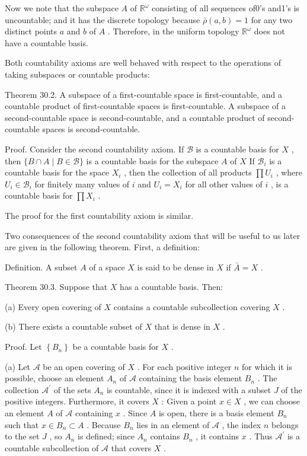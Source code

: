 Now we note that the subspace \(A\) of \({\mathbb{R}}^{\omega }\) consisting of all sequences of0’s and1’s is uncountable; and it has the discrete topology because \(\bar{\rho }\left( {a,b}\right)  = 1\) for any two distinct points \(a\) and \(b\) of \(A\) . Therefore, in the uniform topology \({\mathbb{R}}^{\omega }\) does not have a countable basis.

Both countability axioms are well behaved with respect to the operations of taking subspaces or countable products:

Theorem 30.2. A subspace of a first-countable space is first-countable, and a countable product of first-countable spaces is first-countable. A subspace of a second-countable space is second-countable, and a countable product of second-countable spaces is second-countable.

Proof. Consider the second countability axiom. If \(\mathcal{B}\) is a countable basis for \(X\) , then \(\{ B \cap  A \mid  B \in  \mathcal{B}\}\) is a countable basis for the subspace \(A\) of \(X\) If \({\mathcal{B}}_{i}\) is a countable basis for the space \({X}_{i}\) , then the collection of all products \(\prod {U}_{i}\) , where \({U}_{i} \in  {\mathcal{B}}_{i}\) for finitely many values of \(i\) and \({U}_{i} = {X}_{i}\) for all other values of \(i\) , is a countable basis for \(\prod {X}_{i}\) .

The proof for the first countability axiom is similar.

Two consequences of the second countability axiom that will be useful to us later are given in the following theorem. First, a definition:

Definition. A subset \(A\) of a space \(X\) is said to be dense in \(X\) if \(\bar{A} = X\) .

Theorem 30.3. Suppose that \(X\) has a countable basis. Then:

(a) Every open covering of \(X\) contains a countable subcollection covering \(X\) .

(b) There exists a countable subset of \(X\) that is dense in \(X\) .

Proof. Let \(\left\{  {B}_{n}\right\}\) be a countable basis for \(X\) .

(a) Let \(\mathcal{A}\) be an open covering of \(X\) . For each positive integer \(n\) for which it is possible, choose an element \({A}_{n}\) of \(\mathcal{A}\) containing the basis element \({B}_{n}\) . The collection \({\mathcal{A}}^{\prime }\) of the sets \({A}_{n}\) is countable, since it is indexed with a subset \(J\) of the positive integers. Furthermore, it covers \(X\) : Given a point \(x \in  X\) , we can choose an element \(A\) of \(\mathcal{A}\) containing \(x\) . Since \(A\) is open, there is a basis element \({B}_{n}\) such that \(x \in  {B}_{n} \subset  A\) . Because \({B}_{n}\) lies in an element of \(\mathcal{A}\) , the index \(n\) belongs to the set \(J\) , so \({A}_{n}\) is defined; since \({A}_{n}\) contains \({B}_{n}\) , it contains \(x\) . Thus \({\mathcal{A}}^{\prime }\) is a countable subcollection of \(\mathcal{A}\) that covers \(X\) .

